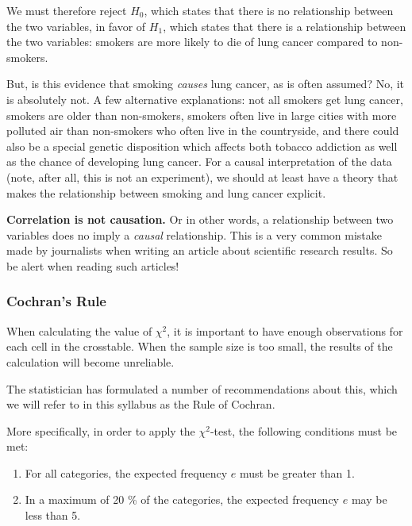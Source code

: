 We must therefore reject $H_{0}$, which states that there is no relationship between the two variables, in favor of $H_{1}$, which states that there is a relationship between the two variables: smokers are more likely to die of lung cancer compared to non-smokers.

But, is this evidence that smoking \emph{causes} lung cancer, as is often assumed? No, it is absolutely not. A few alternative explanations: not all smokers get lung cancer, smokers are older than non-smokers, smokers often live in large cities with more polluted air than non-smokers who often live in the countryside, and there could also be a special genetic disposition which affects both tobacco addiction as well as the chance of developing lung cancer. For a causal interpretation of the data (note, after all, this is not an experiment), we should at least have a theory that makes the relationship between smoking and lung cancer explicit.

\begin{remark}[!!]
  \textbf{Correlation is not causation.} Or in other words, a relationship between two variables does no imply a \emph{causal} relationship. This is a very common mistake made by journalists when writing an article about scientific research results. So be alert when reading such articles!
\end{remark}

\subsubsection{Cochran's Rule}

When calculating the value of $\chi^2$, it is important to have enough observations for each cell in the crosstable. When the sample size is too small, the results of the calculation will become unreliable.

The statistician \textcite{Cochran1954} has formulated a number of recommendations about this, which we will refer to in this syllabus as the Rule of Cochran.

More specifically, in order to apply the $\chi^2$-test, the following conditions must be met:

\begin{enumerate}
  \item For all categories, the expected frequency $e$ must be greater than 1.
  \item In a maximum of 20 \% of the categories, the expected frequency $e$ may be less than 5.
\end{enumerate}

